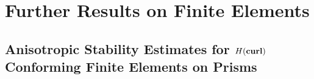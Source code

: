 \chapter{Further Results on Finite Elements}
\label{auxlabel202}
\section{An\-iso\-tropic Stability Estimates for $H(\textbf{curl})$ Conforming Finite
Elements on Prisms}
\label{stab_edge_prism}




